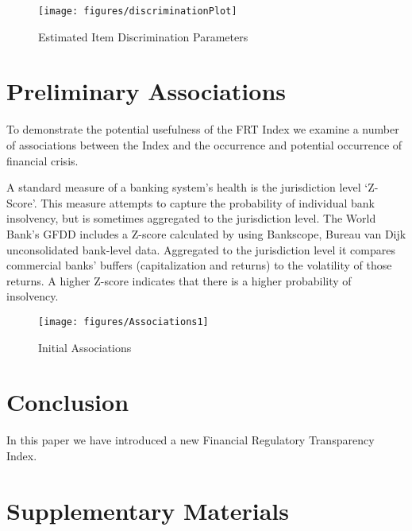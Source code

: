 \documentclass[a4paper]{article}
\begin{document}
\begin{figure}
    \caption{Estimated Item Discrimination Parameters}
    \label{DiscrimFig}
    \begin{center}
        \texttt{[image: figures/discriminationPlot]}
    \end{center}
\end{figure}


\section{Preliminary Associations}

To demonstrate the potential usefulness of the FRT Index we examine a number of associations between the Index and the occurrence and potential occurrence of financial crisis.


A standard measure of a banking system's health is the jurisdiction level `Z-Score'. This measure attempts to capture the probability of individual bank insolvency, but is sometimes aggregated to the jurisdiction level. The World Bank's GFDD includes a Z-score calculated by using Bankscope, Bureau van Dijk unconsolidated bank-level data. Aggregated to the jurisdiction level it compares commercial banks' buffers (capitalization and returns) to the volatility of those returns. A higher Z-score indicates that there is a higher probability of insolvency.

\begin{figure}
    \caption{Initial Associations}
    \label{basicAssoc}
    \begin{center}
        \texttt{[image: figures/Associations1]}
    \end{center}
\end{figure}

\section*{Conclusion}

In this paper we have introduced a new Financial Regulatory Transparency Index.





\section*{Supplementary Materials}

\end{document}
